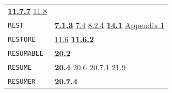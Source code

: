 \documentclass[a4paper,]{article}
\begin{document}
\begin{longtable}[]{@{}ll@{}}
\begin{minipage}[t]{0.70\columnwidth}
\textbf{\href{11-input-output.md\#1177-reset}{11.7.7}} \href{11-input-output.md\#118-terminal-channels}{11.8}\strut
\end{minipage}\tabularnewline
\begin{minipage}[t]{0.24\columnwidth}\raggedright\strut
\texttt{REST}\strut
\end{minipage} & \begin{minipage}[t]{0.70\columnwidth}\raggedright\strut
\textbf{\href{07-structured-objects.md\#713-rest-1}{7.1.3}} \href{07-structured-objects.md\#74-examples-1}{7.4}
\href{08-truth.md\#824-object-properties-1}{8.2.4} \textbf{\href{14-data-type-declarations.md\#141-patterns}{14.1}}
\href{appendix-1-a-look-inside.md\#basic-data-structures}{Appendix 1}\strut
\end{minipage}\tabularnewline
\begin{minipage}[t]{0.24\columnwidth}\raggedright\strut
\texttt{RESTORE}\strut
\end{minipage} & \begin{minipage}[t]{0.70\columnwidth}\raggedright\strut
\href{11-input-output.md\#116-save-files}{11.6} \textbf{\href{11-input-output.md\#1162-restore}{11.6.2}}\strut
\end{minipage}\tabularnewline
\begin{minipage}[t]{0.24\columnwidth}\raggedright\strut
\texttt{RESUMABLE}\strut
\end{minipage} & \begin{minipage}[t]{0.70\columnwidth}\raggedright\strut
\textbf{\href{20-coroutines.md\#202-state-of-a-process}{20.2}}\strut
\end{minipage}\tabularnewline
\begin{minipage}[t]{0.24\columnwidth}\raggedright\strut
\texttt{RESUME}\strut
\end{minipage} & \begin{minipage}[t]{0.70\columnwidth}\raggedright\strut
\textbf{\href{20-coroutines.md\#204-resume}{20.4}} \href{20-coroutines.md\#206-example}{20.6}
\href{20-coroutines.md\#2071-break-seq}{20.7.1} \href{21-interrupts.md\#219-user-defined-interrupts}{21.9}\strut
\end{minipage}\tabularnewline
\begin{minipage}[t]{0.24\columnwidth}\raggedright\strut
\texttt{RESUMER}\strut
\end{minipage} & \begin{minipage}[t]{0.70\columnwidth}\raggedright\strut
\textbf{\href{20-coroutines.md\#2074-resumer}{20.7.4}}\strut
\end{minipage}\tabularnewline

\end{longtable}
\end{document}
